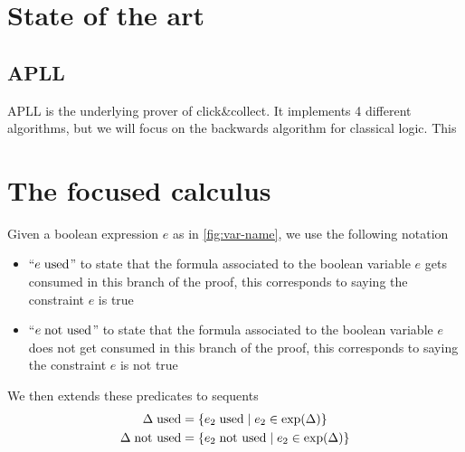 \documentclass[a4paper, 12pt, tesi, english]{report}
\begin{document}
\chapter{State of the art}
\section{APLL}
APLL is the underlying prover of click\&collect. %
It implements 4 different algorithms, but we will focus on the backwards algorithm for classical logic.
This 

\chapter{The focused calculus}

\begin{define}
	Given a boolean expression $e$ as in \ref{fig:var-name}, we use the following notation
	\begin{itemize}
		\item ``$e \; \text{used}$'' to state that the formula associated to the boolean variable $e$ gets consumed in this branch of the proof,
			this corresponds to saying the constraint $e$ is true
		\item ``$e \; \text{not used}$'' to state that the formula associated to the boolean variable $e$ does not get consumed in this branch of the proof,
			this corresponds to saying the constraint $e$ is not true
	\end{itemize}
	We then extends these predicates to sequents
	\begin{align*}
		\Delta \; \text{used} &= \{ e_2 \; \text{used} \mid e_2 \in \text{exp}(\Delta) \} \\
		\Delta \; \text{not used} &= \{ e_2 \; \text{not used} \mid e_2 \in \text{exp}(\Delta) \}
	\end{align*}
\end{define}
\end{document}
